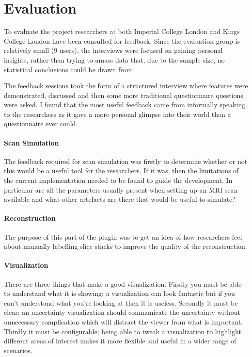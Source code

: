 \chapter{Evaluation}

To evaluate the project researchers at both Imperial College London and Kings College London have been consulted for feedback. Since the evaluation group is relatively small (9 users), the interviews were focused on gaining personal insights, rather than trying to amass data that, due to the sample size, no statistical conclusions could be drawn from.

The feedback sessions took the form of a structured interview where features were demonstrated, discussed and then some more traditional questionnaire questions were asked. I found that the most useful feedback came from informally speaking to the researchers as it gave a more personal glimpse into their world than a questionnaire ever could.

\subsubsection*{Scan Simulation}
The feedback required for scan simulation was firstly to determine whether or not this would be a useful tool for the researchers. If it was, then the limitations of the current implementation needed to be found to guide the development. In particular are all the parameters usually present when setting up an MRI scan available and what other artefacts are there that would be useful to simulate?

\subsubsection*{Reconstruction}
The purpose of this part of the plugin was to get an idea of how researchers feel about manually labelling slice stacks to improve the quality of the reconstruction. 

\subsubsection*{Visualization}
There are three things that make a good visualization. Firstly you must be able to understand what it is showing; a visualization can look fantastic but if you can't understand what you're looking at then it is useless. Secondly it must be clear; an uncertainty visualization should communicate the uncertainty without unnecessary complication which will distract the viewer from what is important. Thirdly it must be configurable; being able to tweak a visualization to highlight different areas of interest makes it more flexible and useful in a wider range of scenarios.